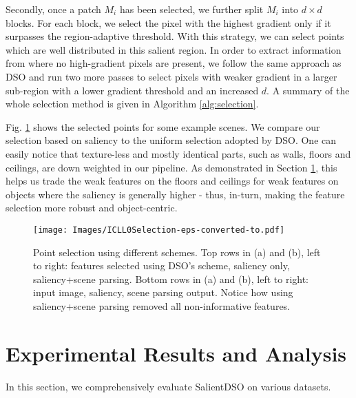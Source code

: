 \documentclass[letterpaper, 10 pt, conference]{ieeeconf}  %
\begin{document}
Secondly, once a patch $M_{i}$ has been selected, we further split $M_{i}$ into $d \times d$ blocks. For each block, we select the pixel with the highest gradient only if it surpasses the region-adaptive threshold. With this strategy, we can select points which are well distributed in this salient region. In order to extract information from where no high-gradient pixels are present, we follow the same approach as DSO and run two more passes to select pixels with weaker gradient in a larger sub-region with a lower gradient threshold and an increased $d$. A summary of the whole selection method is given in Algorithm \ref{alg:selection}.


Fig. \ref{fig:ICLL0Selection} shows the selected points for some example scenes. We compare our selection based on saliency to the uniform selection adopted by DSO. One can easily notice that texture-less and mostly identical parts, such as walls, floors and ceilings, are down weighted in our pipeline. As demonstrated in Section \ref{sec:results}, this helps us trade the weak features on the floors and ceilings for weak features on objects where the saliency is generally higher - thus, in-turn, making the feature selection more robust and object-centric.

\begin{figure}[t!]
    \centering
    \texttt{[image: Images/ICLL0Selection-eps-converted-to.pdf]}
    \caption{Point selection using different schemes. Top rows in (a) and (b), left to right: features selected using DSO's scheme, saliency only, saliency+scene parsing. Bottom rows in (a) and (b), left to right: input image, saliency, scene parsing output. Notice how using saliency+scene parsing removed all non-informative features.}
    \label{fig:ICLL0Selection}
\end{figure}

\section{Experimental Results and Analysis}
\label{sec:results}
In this section, we comprehensively evaluate SalientDSO on various datasets.

\end{document}
